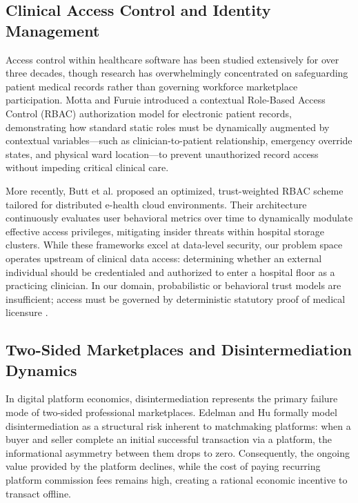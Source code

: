\documentclass[conference]{IEEEtran}
\begin{document}
\subsection{Clinical Access Control and Identity Management}
Access control within healthcare software has been studied extensively for over three decades, though research has overwhelmingly concentrated on safeguarding patient medical records rather than governing workforce marketplace participation. Motta and Furuie \cite{motta2003contextual} introduced a contextual Role-Based Access Control (RBAC) authorization model for electronic patient records, demonstrating how standard static roles must be dynamically augmented by contextual variables---such as clinician-to-patient relationship, emergency override states, and physical ward location---to prevent unauthorized record access without impeding critical clinical care.

More recently, Butt et al. \cite{butt2023optimized} proposed an optimized, trust-weighted RBAC scheme tailored for distributed e-health cloud environments. Their architecture continuously evaluates user behavioral metrics over time to dynamically modulate effective access privileges, mitigating insider threats within hospital storage clusters. While these frameworks excel at data-level security, our problem space operates upstream of clinical data access: determining whether an external individual should be credentialed and authorized to enter a hospital floor as a practicing clinician. In our domain, probabilistic or behavioral trust models are insufficient; access must be governed by deterministic statutory proof of medical licensure \cite{nmc2023regulations, toutanova2023trust}.

\subsection{Two-Sided Marketplaces and Disintermediation Dynamics}
In digital platform economics, disintermediation represents the primary failure mode of two-sided professional marketplaces. Edelman and Hu \cite{edelman2016disintermediation} formally model disintermediation as a structural risk inherent to matchmaking platforms: when a buyer and seller complete an initial successful transaction via a platform, the informational asymmetry between them drops to zero. Consequently, the ongoing value provided by the platform declines, while the cost of paying recurring platform commission fees remains high, creating a rational economic incentive to transact offline.
\end{document}
